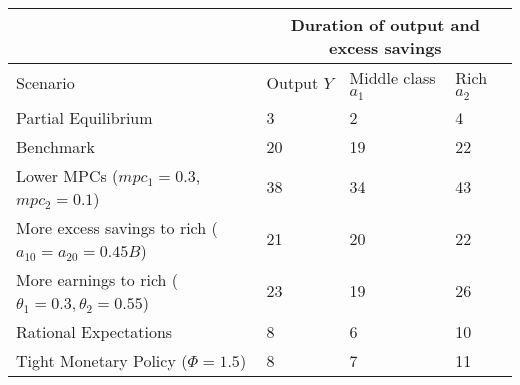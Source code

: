 \documentclass[11pt]{article}
\begin{document}
\begin{tabular}{llll}
\hline
& \multicolumn{3}{c}{Duration of output and excess savings} \\
\hline
Scenario & Output $Y$ & Middle class $a_1$ & Rich $a_2$ \\
\hline\hline
Partial Equilibrium & 3 & 2 & 4 \\

Benchmark & 20 & 19 & 22 \\

Lower MPCs ($mpc_1=0.3$,
$mpc_2=0.1$)
& 38 & 34 & 43 \\

More excess savings to rich ($a_{10}=a_{20}=0.45B$)
& 21 & 20 & 22 \\

More earnings to rich ($\theta_1=0.3,\theta_2=0.55$)
& 23 & 19 & 26 \\

Rational Expectations & 8 & 6 & 10 \\

Tight Monetary Policy ($\Phi = 1.5$)
& 8 & 7 & 11 \\
\hline
\end{tabular}
\end{document}
